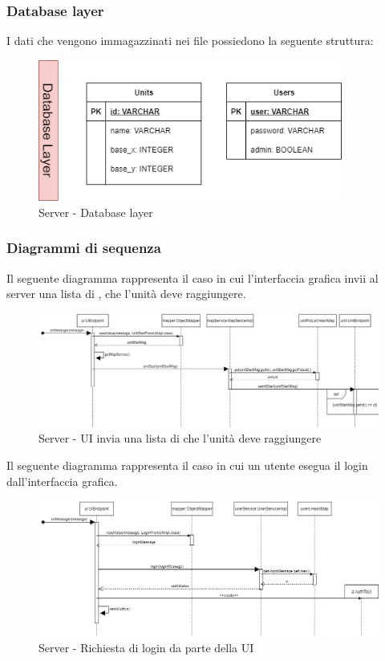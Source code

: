 \subsubsection{Database layer}
I dati che vengono immagazzinati nei file  possiedono la seguente struttura:
\begin{figure}[H]
	\centering
	\includegraphics[width=10cm]{img/server_dblayer.png}
	\caption{Server - Database layer}
\end{figure}

\subsubsection{Diagrammi di sequenza}
Il seguente diagramma rappresenta il caso in cui l'interfaccia grafica invii al server una lista di , che l'unità deve raggiungere.
\begin{figure}[H]
	\centering
	\includegraphics[width=16cm]{img/server_seq1.png}
	\caption{Server - UI invia una lista di  che l'unità deve raggiungere}
\end{figure}

\newpage
Il seguente diagramma rappresenta il caso in cui un utente esegua il login dall'interfaccia grafica.
\begin{figure}[H]
	\centering
	\includegraphics[width=16cm]{img/server_seq2.png}
	\caption{Server - Richiesta di login da parte della UI}
\end{figure}

